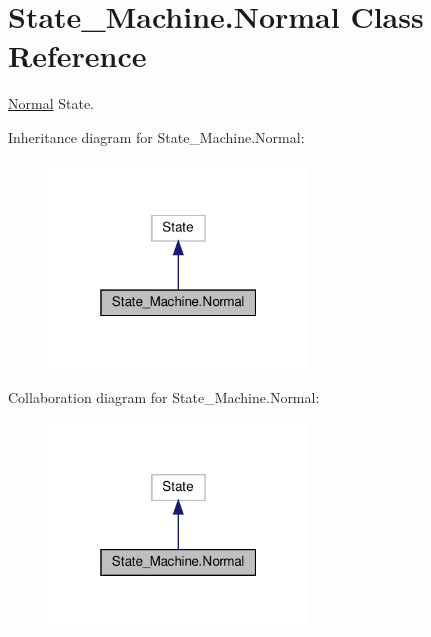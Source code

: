 \hypertarget{classState__Machine_1_1Normal}{}\section{State\+\_\+\+Machine.\+Normal Class Reference}
\label{classState__Machine_1_1Normal}


\hyperlink{classState__Machine_1_1Normal}{Normal} State.  




Inheritance diagram for State\+\_\+\+Machine.\+Normal\+:
\nopagebreak
\begin{figure}[H]
\begin{center}
\leavevmode
\includegraphics[width=196pt]{classState__Machine_1_1Normal__inherit__graph}
\end{center}
\end{figure}


Collaboration diagram for State\+\_\+\+Machine.\+Normal\+:
\nopagebreak
\begin{figure}[H]
\begin{center}
\leavevmode
\includegraphics[width=196pt]{classState__Machine_1_1Normal__coll__graph}
\end{center}
\end{figure}
